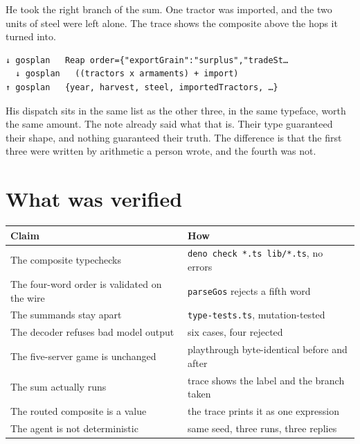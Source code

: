 \documentclass[11pt,a4paper]{article}
\begin{document}
He took the right branch of the sum. One tractor was imported, and the two units of steel were
left alone. The trace shows the composite above the hops it turned into.

\begin{lstlisting}[language=SH]
↓ gosplan   Reap order={"exportGrain":"surplus","tradeSt…
  ↓ gosplan   ((tractors x armaments) + import)
↑ gosplan   {year, harvest, steel, importedTractors, …}
\end{lstlisting}

His dispatch sits in the same list as the other three, in the same typeface, worth the same
amount. The note already said what that is. Their type guaranteed their shape, and nothing
guaranteed their truth. The difference is that the first three were written by arithmetic a
person wrote, and the fourth was not.

\section{What was verified}

\begin{center}
\begin{tabular}{ll}
\toprule
\textbf{Claim} & \textbf{How} \\
\midrule
The composite typechecks & \texttt{deno check *.ts lib/*.ts}, no errors \\
The four-word order is validated on the wire & \texttt{parseGos} rejects a fifth word \\
The summands stay apart & \texttt{type-tests.ts}, mutation-tested \\
The decoder refuses bad model output & six cases, four rejected \\
The five-server game is unchanged & playthrough byte-identical before and after \\
The sum actually runs & trace shows the label and the branch taken \\
The routed composite is a value & the trace prints it as one expression \\
The agent is not deterministic & same seed, three runs, three replies \\
\bottomrule
\end{tabular}
\end{center}
\end{document}
